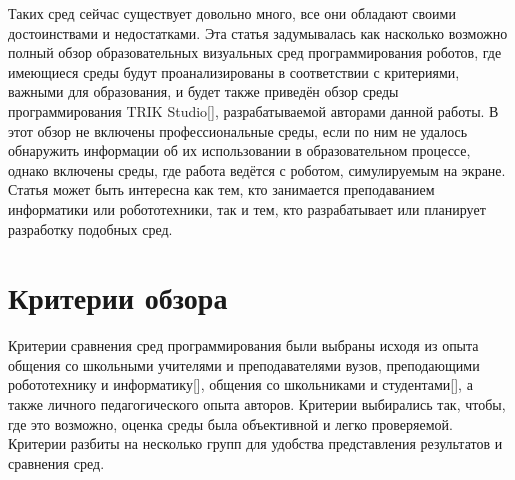 \documentclass[a5paper]{article}
\begin{document}
Таких сред сейчас существует довольно много, все они обладают своими достоинствами и недостатками. Эта статья 
задумывалась как насколько возможно полный обзор образовательных визуальных сред программирования роботов, 
где имеющиеся среды будут проанализированы в соответствии с критериями, важными для образования, и будет 
также приведён обзор среды программирования TRIK Studio[], разрабатываемой авторами данной работы. В этот 
обзор не включены профессиональные среды, если по ним не удалось обнаружить информации об их 
использовании в образовательном процессе, однако включены среды, где работа ведётся с роботом, симулируемым 
на экране. Статья может быть интересна как тем, кто занимается преподаванием информатики или робототехники, 
так и тем, кто разрабатывает или планирует разработку подобных сред.

\section{Критерии обзора}

Критерии сравнения сред программирования были выбраны исходя из опыта общения со школьными учителями и 
преподавателями вузов, преподающими робототехнику и информатику[], общения со школьниками и студентами[], 
а также личного педагогического опыта авторов. Критерии выбирались так, чтобы, где это возможно, оценка 
среды была объективной и легко проверяемой. Критерии разбиты на несколько групп для удобства представления результатов 
и сравнения сред.
\end{document}
